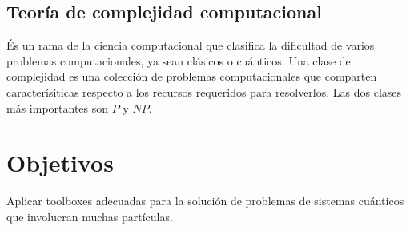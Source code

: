 \documentclass[a4paper]{article}
\begin{document}
  \subsection{Teoría de complejidad computacional}

  És un rama de la ciencia computacional que clasifica la
  dificultad de varios problemas computacionales, ya sean
  clásicos o cuánticos. Una clase de complejidad es una
  colección de problemas computacionales que comparten
  caracterísiticas respecto a los recursos requeridos para
  resolverlos. Las dos clases más importantes son $P$ y
  $NP$.






  
  \newpage
  \section{Objetivos}

  Aplicar toolboxes adecuadas para la solución de problemas
  de sistemas cuánticos que involucran muchas partículas.
\end{document}
